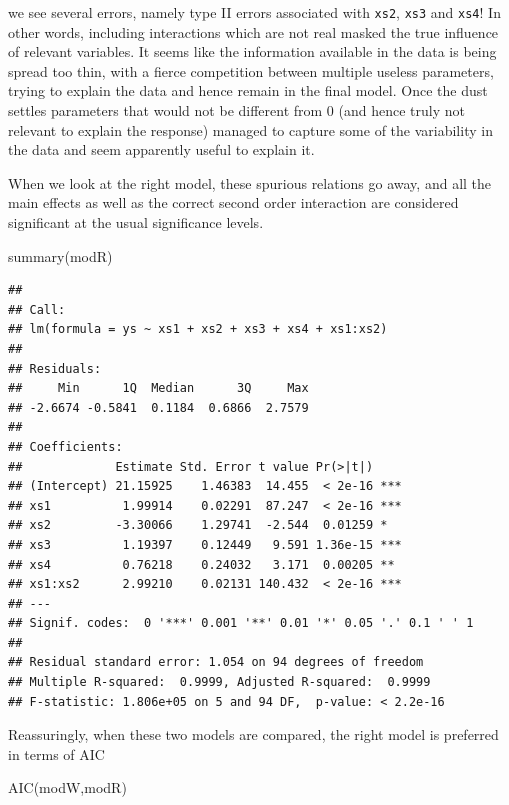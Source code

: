 \documentclass[
]{book}
\newenvironment{Shaded}{\begin{snugshade}}{\end{snugshade}}
\newcommand{\FunctionTok}[1]{\textcolor[rgb]{0.00,0.00,0.00}{#1}}
\newcommand{\NormalTok}[1]{#1}
\begin{document}
we see several errors, namely type II errors associated with \texttt{xs2}, \texttt{xs3} and \texttt{xs4}! In other words, including interactions which are not real masked the true influence of relevant variables. It seems like the information available in the data is being spread too thin, with a fierce competition between multiple useless parameters, trying to explain the data and hence remain in the final model. Once the dust settles parameters that would not be different from 0 (and hence truly not relevant to explain the response) managed to capture some of the variability in the data and seem apparently useful to explain it.

When we look at the right model, these spurious relations go away, and all the main effects as well as the correct second order interaction are considered significant at the usual significance levels.

\begin{Shaded}
\begin{Highlighting}[]
\FunctionTok{summary}\NormalTok{(modR)}
\end{Highlighting}
\end{Shaded}

\begin{verbatim}
## 
## Call:
## lm(formula = ys ~ xs1 + xs2 + xs3 + xs4 + xs1:xs2)
## 
## Residuals:
##     Min      1Q  Median      3Q     Max 
## -2.6674 -0.5841  0.1184  0.6866  2.7579 
## 
## Coefficients:
##             Estimate Std. Error t value Pr(>|t|)    
## (Intercept) 21.15925    1.46383  14.455  < 2e-16 ***
## xs1          1.99914    0.02291  87.247  < 2e-16 ***
## xs2         -3.30066    1.29741  -2.544  0.01259 *  
## xs3          1.19397    0.12449   9.591 1.36e-15 ***
## xs4          0.76218    0.24032   3.171  0.00205 ** 
## xs1:xs2      2.99210    0.02131 140.432  < 2e-16 ***
## ---
## Signif. codes:  0 '***' 0.001 '**' 0.01 '*' 0.05 '.' 0.1 ' ' 1
## 
## Residual standard error: 1.054 on 94 degrees of freedom
## Multiple R-squared:  0.9999, Adjusted R-squared:  0.9999 
## F-statistic: 1.806e+05 on 5 and 94 DF,  p-value: < 2.2e-16
\end{verbatim}

Reassuringly, when these two models are compared, the right model is preferred in terms of AIC

\begin{Shaded}
\begin{Highlighting}[]
\FunctionTok{AIC}\NormalTok{(modW,modR)}
\end{Highlighting}
\end{Shaded}
\end{document}
